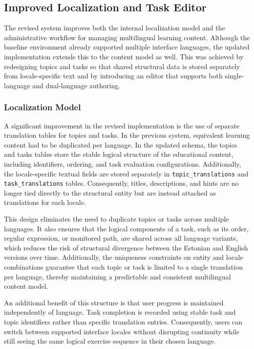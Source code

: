 \subsection{Improved Localization and Task Editor} \label{subsec:improved-localization-and-task-editor}
The revised system improves both the internal localization model and the administrative workflow for managing multilingual learning content.
Although the baseline environment already supported multiple interface languages, the updated implementation extends this to the content model as well.
This was achieved by redesigning topics and tasks so that shared structural data is stored separately from locale-specific text and by introducing an editor that supports both single-language and dual-language authoring.

\subsubsection{Localization Model} \label{subsubsec:localization-model}
A significant improvement in the revised implementation is the use of separate translation tables for topics and tasks.
In the previous system, equivalent learning content had to be duplicated per language.
In the updated schema, the topics and tasks tables store the stable logical structure of the educational content, including identifiers, ordering, and task evaluation configurations.
Additionally, the locale-specific textual fields are stored separately in \texttt{topic\_translations} and \texttt{task\_translations} tables.
Consequently, titles, descriptions, and hints are no longer tied directly to the structural entity but are instead attached as translations for each locale.

This design eliminates the need to duplicate topics or tasks across multiple languages.
It also ensures that the logical components of a task, such as its order, regular expression, or monitored path, are shared across all language variants, which reduces the risk of structural divergence between the Estonian and English versions over time.
Additionally, the uniqueness constraints on entity and locale combinations guarantee that each topic or task is limited to a single translation per language, thereby maintaining a predictable and consistent multilingual content model.

An additional benefit of this structure is that user progress is maintained independently of language.
Task completion is recorded using stable task and topic identifiers rather than specific translation entries.
Consequently, users can switch between supported interface locales without disrupting continuity while still seeing the same logical exercise sequence in their chosen language.

